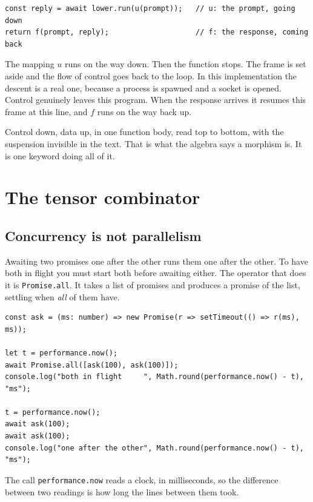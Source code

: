 \documentclass[11pt,a4paper]{article}
\begin{document}
\begin{lstlisting}[language=TS]
const reply = await lower.run(u(prompt));   // u: the prompt, going down
return f(prompt, reply);                    // f: the response, coming back
\end{lstlisting}

The mapping $u$ runs on the way down. Then the function stops. The frame is set aside and the flow
of control goes back to the loop. In this implementation the descent is a real one, because a
process is spawned and a socket is opened. Control genuinely leaves this program. When the response
arrives it resumes this frame at this line, and $f$ runs on the way back up.

Control down, data up, in one function body, read top to bottom, with the suspension invisible in
the text. That is what the algebra says a morphism is. It is one keyword doing all of it.

\newpage

\section{The tensor combinator}
\label{sec:combinators}

\subsection{Concurrency is not parallelism}

Awaiting two promises one after the other runs them one after the other. To have both in flight you
must start both before awaiting either. The operator that does it is \texttt{Promise.all}. It takes
a list of promises and produces a promise of the list, settling when \emph{all} of them have.

\begin{lstlisting}[language=TS]
const ask = (ms: number) => new Promise(r => setTimeout(() => r(ms), ms));

let t = performance.now();
await Promise.all([ask(100), ask(100)]);
console.log("both in flight     ", Math.round(performance.now() - t), "ms");

t = performance.now();
await ask(100);
await ask(100);
console.log("one after the other", Math.round(performance.now() - t), "ms");
\end{lstlisting}

The call \texttt{performance.now} reads a clock, in milliseconds, so the difference between two
readings is how long the lines between them took.
\end{document}
